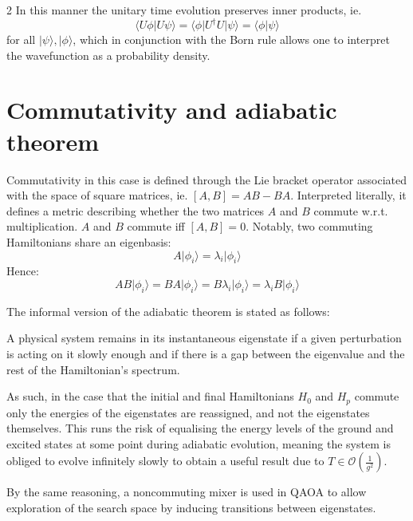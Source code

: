 \documentclass [10pt]{article}
\newcommand {\qvec}[1] {\vert #1 \rangle}
\newcommand {\qcovec}[1] {\langle #1 \vert}
\newcommand {\qinner}[2] {\langle #1 \vert #2 \rangle}
\begin{document}
\begin {multicols}{2}
In this manner the unitary time evolution preserves inner products, ie.
\begin {equation*}
\qinner{U\phi}{U\psi} = \qcovec{\phi} U^\dag U \qvec{\psi}
= \qinner{\phi}{\psi} 
\end {equation*}
for all $\qvec{\psi}, \qvec{\phi}$,
which in conjunction with the Born rule allows one to interpret the
wavefunction as a probability density.

\section {Commutativity and adiabatic theorem}
\label {adiabatic}
Commutativity in this case is defined through the Lie bracket operator
associated with the space of square matrices, ie. $[A, B] = AB - BA$.
Interpreted literally, it defines a metric describing whether the two matrices
$A$ and $B$ commute w.r.t. multiplication. $A$ and $B$ commute iff
$[A, B] = 0$. Notably, two commuting Hamiltonians share an eigenbasis:
\begin {equation*}
A \qvec{\phi_i} = \lambda_i \qvec{\phi_i}
\end {equation*}
Hence:
\begin {equation*}
AB \qvec{\phi_i} = BA \qvec{\phi_i} = B \lambda_i \qvec{\phi_i}
= \lambda_i B \qvec{\phi_i}
\end {equation*}

The informal version of the adiabatic theorem is stated as follows:
\begin {displayquote}
A physical system remains in its instantaneous eigenstate if a given
perturbation is acting on it slowly enough and if there is a gap between the
eigenvalue and the rest of the Hamiltonian's spectrum. \cite{adiabatictheo}
\end {displayquote}

As such, in the case that the initial and final Hamiltonians $H_0$ and $H_p$
commute only the energies of the eigenstates are reassigned, and not the
eigenstates themselves. This runs the risk of equalising the energy levels of
the ground and excited states at some point during adiabatic evolution,
meaning the system is obliged to evolve infinitely slowly to obtain a
useful result due to $T \in \mathcal{O}(\frac{1}{g^2})$.

By the same reasoning, a noncommuting mixer is used in QAOA to allow
exploration of the search space by inducing transitions between eigenstates.


\end{multicols}
\end{document}
